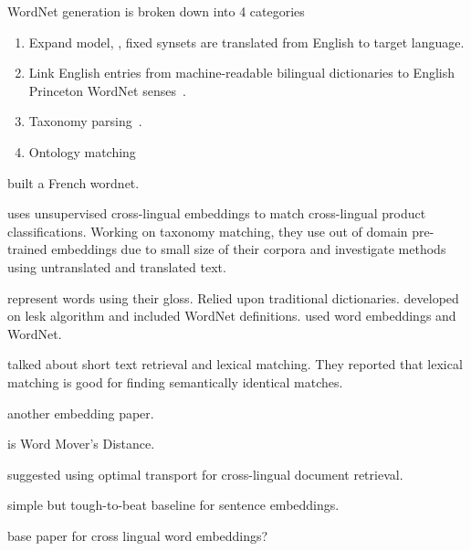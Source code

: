 WordNet generation is broken down into 4 categories
\begin{enumerate}
    \item Expand model, \textcite{vossen_introduction_1998}, fixed synsets are translated from English to target language.
    \item Link English entries from machine-readable bilingual dictionaries to English Princeton WordNet senses~\textcite{knight_building_1994}.
    \item Taxonomy parsing~\textcite{farreres_using_1998}.
    \item Ontology matching~\textcite{farreres_towards_2004}
\end{enumerate}

\textcite{sagot_building_2008} built a French wordnet.

\textcite{gordeev_unsupervised_2018} uses unsupervised cross-lingual embeddings to match cross-lingual product classifications.
Working on taxonomy matching, they use out of domain pre-trained embeddings due to small size of their corpora and investigate methods using untranslated and translated text.

\textcite{lesk_automatic_1986} represent words using their gloss.
Relied upon traditional dictionaries.
\textcite{banerjee_adapted_2002} developed on lesk algorithm and included WordNet definitions.
\textcite{khodak_automated_2017} used word embeddings and WordNet.

\textcite{metzler_similarity_2007} talked about short text retrieval and lexical matching.
They reported that lexical matching is good for finding semantically identical matches.

\textcite{xiao_distributed_2014} another embedding paper.

\textcite{kusner_word_2015} is Word Mover's Distance.

\textcite{balikas_cross-lingual_2018} suggested using optimal transport for cross-lingual document retrieval.

\textcite{arora_simple_2016} simple but tough-to-beat baseline for sentence embeddings.

\textcite{klementiev_inducing_2012} base paper for cross lingual word embeddings?
